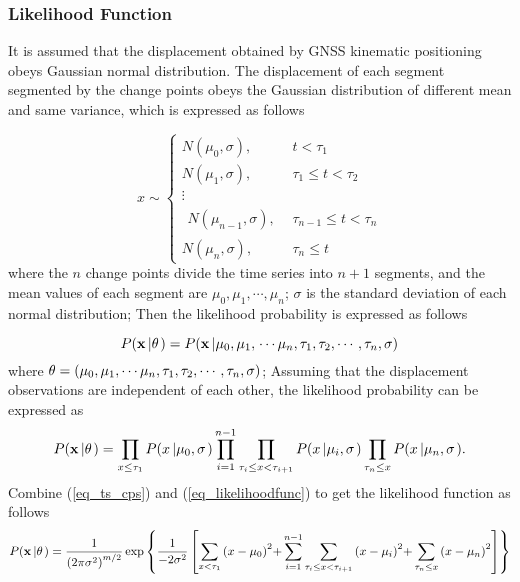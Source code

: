 \documentclass[final,3p,times]{elsarticle}
\begin{document}
	\subsubsection{Likelihood Function}
	It is assumed that the displacement obtained by GNSS kinematic positioning obeys Gaussian normal distribution.  The displacement of each segment segmented by the change points obeys the Gaussian distribution of different mean and same variance, which is expressed as follows
	
	\begin{equation}\label{eq_ts_cps}
	x \sim \left\{ {\begin{array}{*{20}{r}}
		{N({\mu _0},\sigma ),}&{t < {\tau _1}}\\
		{N({\mu _1},\sigma ),}&{{\tau _1} \le t < {\tau _2}}\\
		\vdots &{}\\
		{\begin{array}{*{20}{c}}
			{N({\mu _{n-1}},\sigma ),}
			\end{array}}&{{\tau _{n - 1}} \le t < {\tau _n}}\\
		{N({\mu _{n}},\sigma ),}&{{\tau _n} \le t}
		\end{array}} \right.
	\end{equation}
	where the $n$ change points divide the time series into $n+1$ segments, and the mean values of each segment are ${\mu _0},{\mu _1},\cdots,{\mu _n}$; $\sigma$ is the standard deviation of each normal distribution; Then the likelihood probability is expressed as follows
	
	\begin{equation}\label{eq_likelihood}
	P({\bf{x}}\left| {\bf{\theta }} \right.) = P({\bf{x}}\left| {{\mu_0},{\mu_1},} \right. \cdots {\mu_n},{\tau _1},{\tau _2}, \cdots ,{\tau _n},\sigma )
	\end{equation}
	where ${\bf{\theta }}=({{\mu_0},{\mu_1},} \cdots {\mu_n},{\tau _1},{\tau _2}, \cdots ,{\tau _n},\sigma) $; Assuming that the displacement observations are independent of each other, the likelihood probability can be expressed as
	\begin{equation}\label{eq_likelihoodfunc}
	P({\bf{x}}\left| {\bf{\theta }} \right.) = \prod\limits_{x \le {\tau _1}} {P(x\left| {{\mu_0},\sigma } \right.)} \prod\limits_{i = 1}^{n - 1} {\prod\limits_{{\tau _i} \le x < {\tau _{i + 1}}} {P(x\left| {{\mu_i},\sigma } \right.)} \prod\limits_{{\tau _n} \le x} {P(x\left| {{\mu_n},\sigma } \right.)} }.
	\end{equation}
	Combine (\ref{eq_ts_cps}) and (\ref{eq_likelihoodfunc}) to get the likelihood function as follows
	\begin{equation}\label{eq_likelihoodfunc_detail}
	P({\bf{x}}\left| {\bf{\theta }} \right.) = \frac{1}{{{{(2\pi {\sigma ^2})}^{m/2}}}}\exp \left\{ {\frac{1}{{ - 2{\sigma ^2}}}\left[ {\sum\limits_{x < {\tau _1}} {{{(x - {\mu_0})}^2}} {\rm{ + }}\sum\limits_{i = 1}^{n - 1} {\sum\limits_{{\tau _i} \le x < {\tau _{i + 1}}} {{{(x - {\mu_i})}^2}} } {\rm{ + }}\sum\limits_{{\tau _n} \le x} {{{(x - {\mu_n})}^2}} } \right]} \right\}
	\end{equation}
\end{document}
